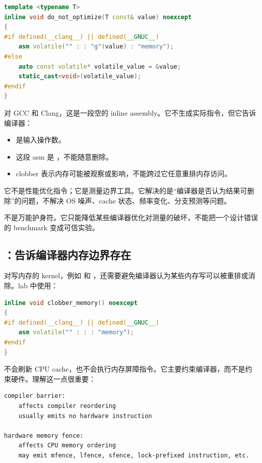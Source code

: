 \begin{lstlisting}[language=C++]
template <typename T>
inline void do_not_optimize(T const& value) noexcept
{
#if defined(__clang__) || defined(__GNUC__)
    asm volatile("" : : "g"(value) : "memory");
#else
    auto const volatile* volatile_value = &value;
    static_cast<void>(volatile_value);
#endif
}
\end{lstlisting}

对 GCC 和 Clang，这是一段空的 inline assembly。它不生成实际指令，但它告诉编译器：

\begin{itemize}
  \item {} 是输入操作数。
  \item 这段 asm 是 ，不能随意删除。
  \item {} clobber 表示内存可能被观察或影响，不能跨过它任意重排内存访问。
\end{itemize}

它不是性能优化指令；它是测量边界工具。它解决的是“编译器是否认为结果可删除”的问题，不解决 OS 噪声、cache 状态、频率变化、分支预测等问题。

\begin{warningbox}
 不是万能护身符。它只能降低某些编译器优化对测量的破坏，不能把一个设计错误的 benchmark 变成可信实验。
\end{warningbox}

\subsection{：告诉编译器内存边界存在}

对写内存的 kernel，例如  和 ，还需要避免编译器认为某些内存写可以被重排或消除。lab 中使用：

\begin{lstlisting}[language=C++]
inline void clobber_memory() noexcept
{
#if defined(__clang__) || defined(__GNUC__)
    asm volatile("" : : : "memory");
#endif
}
\end{lstlisting}

 不会刷新 CPU cache，也不会执行内存屏障指令。它主要约束编译器，而不是约束硬件。理解这一点很重要：

\begin{lstlisting}
compiler barrier:
    affects compiler reordering
    usually emits no hardware instruction

hardware memory fence:
    affects CPU memory ordering
    may emit mfence, lfence, sfence, lock-prefixed instruction, etc.
\end{lstlisting}

